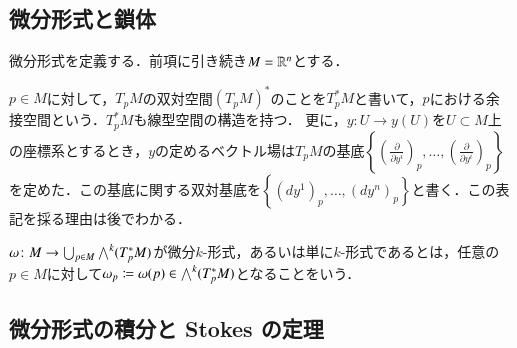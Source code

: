 \subsection{微分形式と鎖体}

微分形式を定義する．前項に引き続き$M = \mathbb{R}^n$とする．

\begin{defi}
$p \in M$に対して，$T_pM$の双対空間$(T_pM)^*$のことを$T_p^*M$と書いて，$p$における余接空間という．$T_p^*M$も線型空間の構造を持つ．
更に，$y \colon U \to y(U)$を$U \subset M$上の座標系とするとき，$y$の定めるベクトル場は$T_pM$の基底$\left\{ \left(\frac{\partial}{\partial y^i}\right)_p,\dots, \left(\frac{\partial}{\partial y^i}\right)_p \right\}$を定めた．この基底に関する双対基底を$\left\{ (dy^1)_p,\dots, \left(dy^n\right)_p \right\}$と書く．この表記を採る理由は後でわかる．
\end{defi}

\begin{defi}
$\omega \colon M \to \bigcup_{p \in M} \bigwedge^k(T_p^*M)$が微分$k$-形式，あるいは単に$k$-形式であるとは，任意の$p \in M$に対して$\omega_p \coloneqq \omega(p) \in \bigwedge^k(T_p^*M)$となることをいう．
\end{defi}

\subsection{微分形式の積分と Stokes の定理}